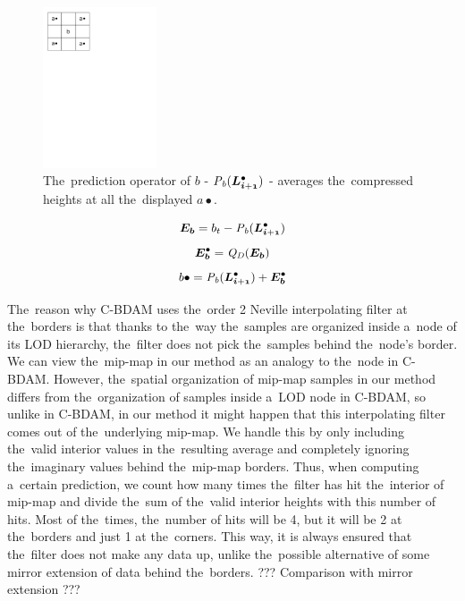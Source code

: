 \begin{figure}
	\includegraphics[trim={0 21cm 10cm 0}, clip, width=0.3\textwidth]{figures/bcomp.pdf}\centering
	\caption{The~prediction operator of $b$ - $\opnorm{P}{b}(\ldot{i+1})$ - averages the~compressed heights at all the~displayed $a\bullet$.}
	\label{fig:bcomp}
\end{figure}

$$\objnorm{E}{b} = b_t - \opnorm{P}{b}(\ldot{i+1})$$
$$\objdot{E}{b} = \opnorm{Q}{D}(\objnorm{E}{b})$$
\begin{equation}
\label{eq:b}
b\bullet = \opnorm{P}{b}(\ldot{i+1}) + \objdot{E}{b}
\end{equation}

The~reason why C-BDAM uses the~order 2 Neville interpolating filter at the~borders is that thanks to the~way the~samples are organized inside a~node of its LOD hierarchy, the~filter does not pick the~samples behind the~node's border. We can view the~mip-map in our method as an analogy to the~node in C-BDAM. However, the~spatial organization of mip-map samples in our method differs from the~organization of samples inside a~LOD node in C-BDAM, so unlike in C-BDAM, in our method it might happen that this interpolating filter comes out of the~underlying mip-map. We handle this by only including the~valid interior values in the~resulting average and completely ignoring the~imaginary values behind the~mip-map borders. Thus, when computing a~certain prediction, we count how many times the~filter has hit the~interior of mip-map and divide the~sum of the~valid interior heights with this number of hits. Most of the~times, the~number of hits will be 4, but it will be 2 at the~borders and just 1 at the~corners. This way, it is always ensured that the~filter does not make any data up, unlike the~possible alternative of some mirror extension of data behind the~borders. ??? Comparison with mirror extension ???

